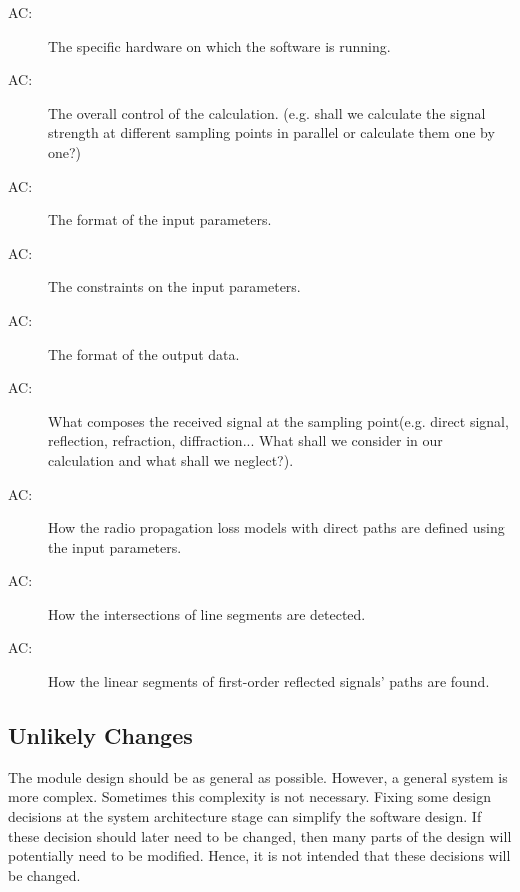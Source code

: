 \documentclass[12pt, titlepage]{article}
\newcounter{acnum}
\newcommand{\actheacnum}{AC\theacnum}
\begin{document}
\begin{description}
\item[ \actheacnum \label{acHardware}:] The specific
  hardware on which the software is running.
\item[ \actheacnum \label{acControl}:] The overall control of the calculation. (e.g. shall we calculate the signal strength at different sampling points in parallel or calculate them one by one?)
\item[ \actheacnum \label{acInputParam}:] The format of the
  input parameters.
\item[ \actheacnum \label{acInputConstr}:] The constraints on the
  input parameters.
\item[ \actheacnum \label{acOutputParam}:] The format of the
  output data.
\item[ \actheacnum \label{acSignalCompose}:] What composes the received signal at the sampling point(e.g. direct signal, reflection, refraction, diffraction... What shall we consider in our calculation and what shall we neglect?).
\item[ \actheacnum \label{acDirectLoss}:] How the radio propagation loss models with direct paths are defined using the input parameters.
\item[ \actheacnum \label{acIntersection}:] How the intersections of line segments are detected.
\item[ \actheacnum \label{acPathSegments}:] How the linear segments of first-order reflected signals' paths are found. 
\end{description}

\subsection{Unlikely Changes} \label{SecUchange}

The module design should be as general as possible. However, a general system is
more complex. Sometimes this complexity is not necessary. Fixing some design
decisions at the system architecture stage can simplify the software design. If
these decision should later need to be changed, then many parts of the design
will potentially need to be modified. Hence, it is not intended that these
decisions will be changed.
\end{document}
